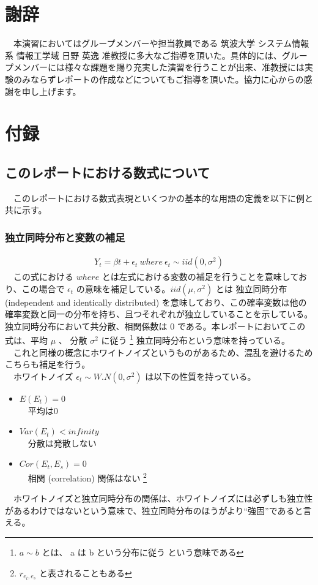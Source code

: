 \documentclass{scrartcl}
\begin{document}
\section{謝辞}
\label{sec:orgab0062c}
　本演習においてはグループメンバーや担当教員である 筑波大学 システム情報系 情報工学域 日野 英逸 准教授に多大なご指導を頂いた。具体的には、グループメンバーには様々な課題を賜り充実した演習を行うことが出来、准教授には実験のみならずレポートの作成などについてもご指導を頂いた。協力に心からの感謝を申し上げます。
\newpage
\section{付録}
\label{sec:orgf55781c}
\subsection{このレポートにおける数式について}
\label{sec:orgc97f0cc}
　このレポートにおける数式表現といくつかの基本的な用語の定義を以下に例と共に示す。\\
\subsubsection{独立同時分布と変数の補足}
\label{sec:org6fbf02b}
\begin{align}
Y_t = \beta t + \epsilon_t \ where \ \epsilon_t \sim iid(0, \sigma^2)
\end{align}
　この式における \(where\) とは左式における変数の補足を行うことを意味しており、この場合で \(\epsilon_t\) の意味を補足している。\(iid(\mu, \sigma^2)\) とは 独立同時分布 (independent and identically distributed) を意味しており、この確率変数は他の確率変数と同一の分布を持ち、且つそれぞれが独立していることを示している。独立同時分布において共分散、相関係数は 0 である。本レポートにおいてこの式は、平均 \(\mu\) 、 分散 \(\sigma^2\) に従う \footnote{$a \sim b$ とは、 a は b という分布に従う という意味である} 独立同時分布という意味を持っている。\\
　これと同様の概念にホワイトノイズというものがあるため、混乱を避けるためこちらも補足を行う。\\
　ホワイトノイズ \(\epsilon_t \sim W.N(0, \sigma^2)\) は以下の性質を持っている。\\
\begin{itemize}
\item \(E(E_t) = 0\) \\
　平均は0\\
\item \(Var(E_t) < infinity\) \\
　分散は発散しない\\
\item \(Cor(E_t, E_s) = 0\) \\
　相関 (correlation) 関係はない \footnote{$r_{e_t, e_s}$ と表されることもある} \\
\end{itemize}
　ホワイトノイズと独立同時分布の関係は、ホワイトノイズには必ずしも独立性があるわけではないという意味で、独立同時分布のほうがより``強固''であると言える。　\\
\newpage
\end{document}

